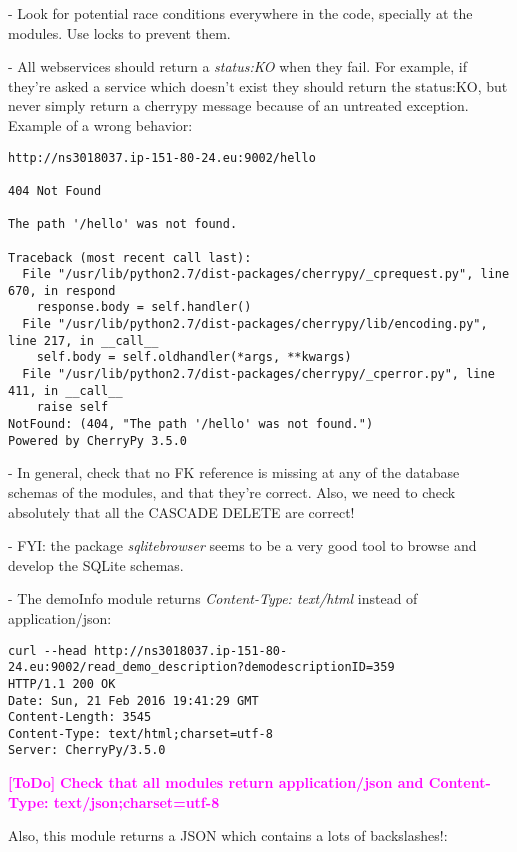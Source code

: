 \documentclass[a4paper,12pt]{article}
\newcommand{\ToDo}[1]{\textcolor{magenta}{\textbf{[ToDo]} \textbf{#1}}}
\begin{document}
- Look for potential race conditions everywhere in the code, specially at the modules. Use locks to prevent them.

- All webservices should return a \emph{status:KO} when they fail. For example, if they're asked a service which doesn't exist they should return the status:KO, but never simply return a cherrypy message because of an untreated exception. Example of a wrong behavior:

\begin{verbatim}
http://ns3018037.ip-151-80-24.eu:9002/hello

404 Not Found

The path '/hello' was not found.

Traceback (most recent call last):
  File "/usr/lib/python2.7/dist-packages/cherrypy/_cprequest.py", line 670, in respond
    response.body = self.handler()
  File "/usr/lib/python2.7/dist-packages/cherrypy/lib/encoding.py", line 217, in __call__
    self.body = self.oldhandler(*args, **kwargs)
  File "/usr/lib/python2.7/dist-packages/cherrypy/_cperror.py", line 411, in __call__
    raise self
NotFound: (404, "The path '/hello' was not found.")
Powered by CherryPy 3.5.0
\end{verbatim}

- In general, check that no FK reference is missing at any of the database schemas of the modules, and that they're correct.
Also, we need to check absolutely that all the CASCADE DELETE are correct!

- FYI: the package \emph{sqlitebrowser} seems to be a very good tool to browse and develop the SQLite schemas.

- The demoInfo module returns \emph{Content-Type: text/html} instead of application/json:

\begin{verbatim}
curl --head http://ns3018037.ip-151-80-24.eu:9002/read_demo_description?demodescriptionID=359
HTTP/1.1 200 OK
Date: Sun, 21 Feb 2016 19:41:29 GMT
Content-Length: 3545
Content-Type: text/html;charset=utf-8
Server: CherryPy/3.5.0
\end{verbatim}
\ToDo{Check that all modules return application/json and Content-Type: text/json;charset=utf-8}

Also, this module returns a JSON which contains a lots of backslashes!:
\end{document}

